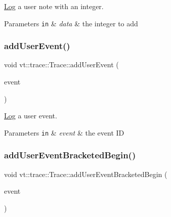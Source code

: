 \hyperlink{structvt_1_1trace_1_1_log}{Log} a user note with an integer. 


\begin{DoxyParams}[1]{Parameters}
\mbox{\tt in}  & {\em data} & the integer to add \\
\hline
\end{DoxyParams}
\mbox{\label{structvt_1_1trace_1_1_trace_a0a4bbdf7bd3c2b8742cbceb24389a4c0}} 
\subsubsection{\texorpdfstring{add\+User\+Event()}{addUserEvent()}}
{\footnotesize\ttfamily void vt\+::trace\+::\+Trace\+::add\+User\+Event (\begin{DoxyParamCaption}\item[{\hyperlink{namespacevt_1_1trace_a5908920d051c144c89f17c69ed262350}{User\+Event\+I\+D\+Type}}]{event }\end{DoxyParamCaption})}



\hyperlink{structvt_1_1trace_1_1_log}{Log} a user event. 


\begin{DoxyParams}[1]{Parameters}
\mbox{\tt in}  & {\em event} & the event ID \\
\hline
\end{DoxyParams}
\mbox{\label{structvt_1_1trace_1_1_trace_a1264ea508298bfeb6a6ef5e06d9214f9}} 
\subsubsection{\texorpdfstring{add\+User\+Event\+Bracketed\+Begin()}{addUserEventBracketedBegin()}}
{\footnotesize\ttfamily void vt\+::trace\+::\+Trace\+::add\+User\+Event\+Bracketed\+Begin (\begin{DoxyParamCaption}\item[{\hyperlink{namespacevt_1_1trace_a5908920d051c144c89f17c69ed262350}{User\+Event\+I\+D\+Type}}]{event }\end{DoxyParamCaption})}



